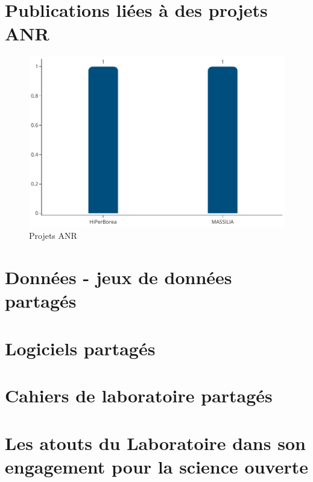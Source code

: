 \documentclass[french, 11pt]{assets/biso}
\begin{document}
\section{Publications liées à des projets ANR}

\begin{figure}[!h]
  \includegraphics[width=.8\textwidth]{figures/anr_projects.pdf}
  \centering
  \caption{Projets ANR}
  \label{fig_anr_projects}
\end{figure}


\pagebreak

\section{Données - jeux de données partagés}



\section{Logiciels partagés}



\section{Cahiers de laboratoire partagés}




\pagebreak

\section{Les atouts du Laboratoire dans son engagement pour la science ouverte}
\end{document}
